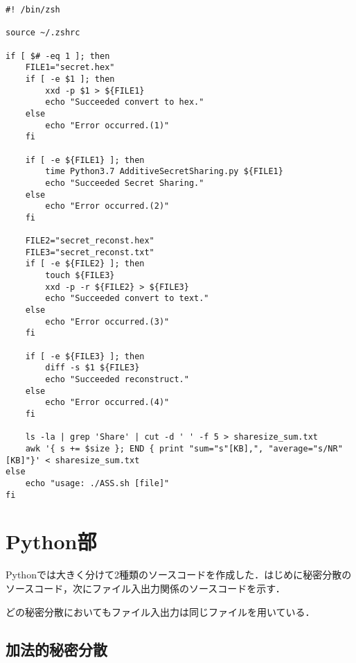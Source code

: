 \documentclass[10pt, a4paper, titlepage]{jsreport}
\begin{document}
	\begin{lstlisting}[caption=ASS.sh, label=ASS.sh]
#! /bin/zsh

source ~/.zshrc

if [ $# -eq 1 ]; then
	FILE1="secret.hex"
	if [ -e $1 ]; then
		xxd -p $1 > ${FILE1}
		echo "Succeeded convert to hex."
	else
		echo "Error occurred.(1)"
	fi

	if [ -e ${FILE1} ]; then
		time Python3.7 AdditiveSecretSharing.py ${FILE1}
		echo "Succeeded Secret Sharing."
	else
		echo "Error occurred.(2)"
	fi

	FILE2="secret_reconst.hex"
	FILE3="secret_reconst.txt"
	if [ -e ${FILE2} ]; then
		touch ${FILE3}
		xxd -p -r ${FILE2} > ${FILE3}
		echo "Succeeded convert to text."
	else
		echo "Error occurred.(3)"
	fi

	if [ -e ${FILE3} ]; then
		diff -s $1 ${FILE3}
		echo "Succeeded reconstruct."
	else
		echo "Error occurred.(4)"
	fi

	ls -la | grep 'Share' | cut -d ' ' -f 5 > sharesize_sum.txt
	awk '{ s += $size }; END { print "sum="s"[KB],", "average="s/NR"[KB]"}' < sharesize_sum.txt
else
	echo "usage: ./ASS.sh [file]"
fi
	\end{lstlisting}

	\section{Python部}
	Pythonでは大きく分けて2種類のソースコードを作成した．はじめに秘密分散のソースコード，次にファイル入出力関係のソースコードを示す．

	どの秘密分散においてもファイル入出力は同じファイルを用いている．

	\subsection{加法的秘密分散}
\end{document}
